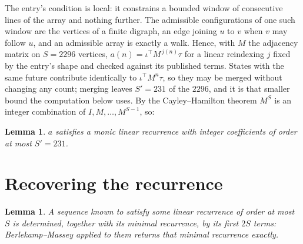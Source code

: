 \documentclass[11pt,a4paper]{article}
\theoremstyle{plain}
\newtheorem{lemma}[theorem]{Lemma}
\theoremstyle{definition}
\begin{document}
The entry's condition is local: it constrains a bounded window of consecutive lines of the
array and nothing further. The admissible configurations of one such window are the vertices
of a finite digraph, an edge joining $u$ to $v$ when $v$ may follow $u$, and an admissible
array is exactly a walk. Hence, with $M$ the adjacency matrix on $S=2296$ vertices,
$a(n)=\iota^{\!\top}M^{\,j(n)}\tau$ for a linear reindexing $j$ fixed by the entry's shape
and checked against its published terms. States with the same future contribute identically to $\iota^{\!\top}M^n\tau$, so they may be merged without changing any count; merging leaves $S'=231$ of the $2296$, and it is that smaller bound the computation below uses. By the Cayley--Hamilton theorem $M^{S}$ is an
integer combination of $I,M,\dots,M^{S-1}$, so:

\begin{lemma}\label{lem:cf}
$a$ satisfies a monic linear recurrence with integer coefficients of order at most
$S'=231$.
\end{lemma}

\section{Recovering the recurrence}

\begin{lemma}\label{lem:bm}
A sequence known to satisfy some linear recurrence of order at most $S$ is determined, together
with its minimal recurrence, by its first $2S$ terms: Berlekamp--Massey applied to them returns
that minimal recurrence exactly.
\end{lemma}
\end{document}
